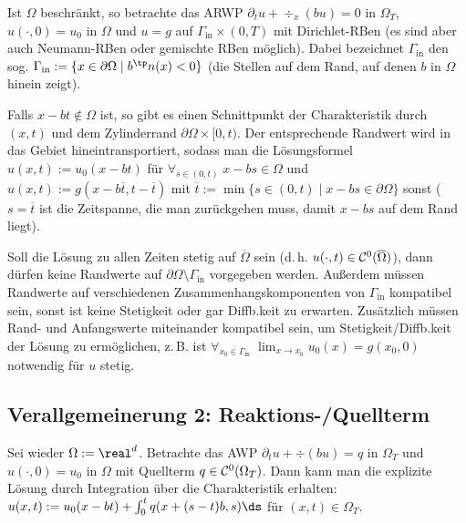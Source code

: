 \begin{Bem}
    Ist $\Omega$ beschränkt, so betrachte das ARWP
    $\partial_t u + \div_x(bu) = 0$ in $\Omega_T$,
    $u(\cdot, 0) = u_0$ in $\Omega$ und
    $u = g$ auf $\Gamma_\text{in} \times (0, T)$
    mit Dirichlet-RBen (es sind aber auch Neumann-RBen oder gemischte RBen möglich).
    Dabei bezeichnet $\Gamma_\text{in}$ den sog. 
    $\Gamma_\text{in} := \{x \in \partial\Omega \;|\; b^\tp n(x) < 0\}$
    (die Stellen auf dem Rand, auf denen $b$ in $\Omega$ hinein zeigt).

    Falls $x - bt \notin \Omega$ ist, so gibt es einen Schnittpunkt der Charakteristik durch
    $(x, t)$ und dem Zylinderrand $\partial\Omega \times [0, t)$.
    Der entsprechende Randwert wird in das Gebiet hineintransportiert, sodass man die Lösungsformel
    $u(x, t) := u_0(x - bt)$ für $\forall_{s \in (0, t)}\; x - bs \in \Omega$ und\\
    $u(x, t) := g(x - b\overline{t}, t - \overline{t})$ mit
    $\overline{t} := \min\{s \in (0, t) \;|\; x - bs \in \partial\Omega\}$ sonst
    ($s = \overline{t}$ ist die Zeitspanne, die man zurückgehen muss, damit $x - bs$ auf dem Rand
    liegt).

    Soll die Lösung zu allen Zeiten stetig auf $\overline{\Omega}$ sein
    (d.\,h. $u(\cdot, t) \in \mathcal{C}^0(\overline{\Omega})$), dann dürfen keine Randwerte auf
    $\partial\Omega \setminus \Gamma_\text{in}$ vorgegeben werden.
    Außerdem müssen Randwerte auf verschiedenen Zusammenhangskomponenten von $\Gamma_\text{in}$
    kompatibel sein, sonst ist keine Stetigkeit oder gar Diffb.keit zu erwarten.
    Zusätzlich müssen Rand- und Anfangswerte miteinander kompatibel sein, um Stetigkeit/Diffb.keit
    der Lösung zu ermöglichen, z.\,B. ist
    $\forall_{x_0 \in \Gamma_\text{in}}\; \lim_{x \to x_0} u_0(x) = g(x_0, 0)$
    notwendig für $u$ stetig.
\end{Bem}

\subsection{%
    Verallgemeinerung 2: Reaktions-/Quellterm%
}

\begin{Bem}
    Sei wieder $\Omega := \real^d$.
    Betrachte das AWP $\partial_t u + \div(bu) = q$ in $\Omega_T$ und $u(\cdot, 0) = u_0$ in
    $\Omega$ mit Quellterm $q \in \mathcal{C}^0(\Omega_T)$.
    Dann kann man die explizite Lösung durch Integration über die Charakteristik erhalten:
    $u(x, t) := u_0(x - bt) + \int_0^t q(x + (s-t)b, s)\ds$ für $(x, t) \in \Omega_T$.
\end{Bem}

